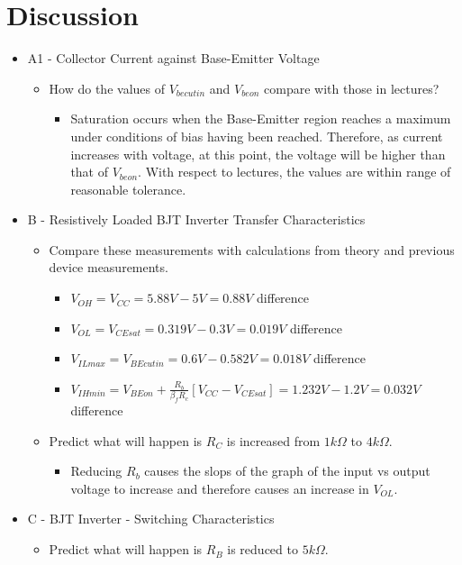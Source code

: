 \documentclass[12pt]{article}
\begin{document}
\section{Discussion}
\begin{itemize}
\item A1 - Collector Current against Base-Emitter Voltage
\begin{itemize}
\item How do the values of $V_{be cut in}$ and $V_{be on}$ compare with those in lectures?
\begin{itemize}
\item Saturation occurs when the Base-Emitter region reaches a maximum under conditions of bias having been reached. Therefore, as current increases with voltage, at this point, the voltage will be higher than that of $V_{be on}$. With respect to lectures, the values are within range of reasonable tolerance.
\end{itemize}
\end{itemize}
\item B - Resistively Loaded BJT Inverter Transfer Characteristics
\begin{itemize}
\item Compare these measurements with calculations from theory and previous device measurements.
\begin{itemize}
\item $V_{OH}=V_{CC}=5.88V-5V=0.88V$ difference
\item $V_{OL}=V_{CE sat}=0.319V-0.3V=0.019V$ difference
\item $V_{IL max}=V_{BE cut in}=0.6V-0.582V=0.018V$ difference
\item $V_{IH min}=V_{BE on} + \frac{R_{b}}{\beta_{f}R_{c}}\left[V_{CC}-V_{CE sat}\right]=1.232V-1.2V=0.032V$ difference
\end{itemize}
\item Predict what will happen is $R_C$ is increased from $1k\Omega$ to $4k\Omega$.
\begin{itemize}
\item Reducing $R_b$ causes the slops of the graph of the input vs output voltage to increase and therefore causes an increase in $V_{OL}$.
\end{itemize}
\end{itemize}
\item C - BJT Inverter - Switching Characteristics
\begin{itemize}
\item Predict what will happen is $R_B$ is reduced to $5k\Omega$.

\end{itemize}
\end{itemize}
\end{document}
